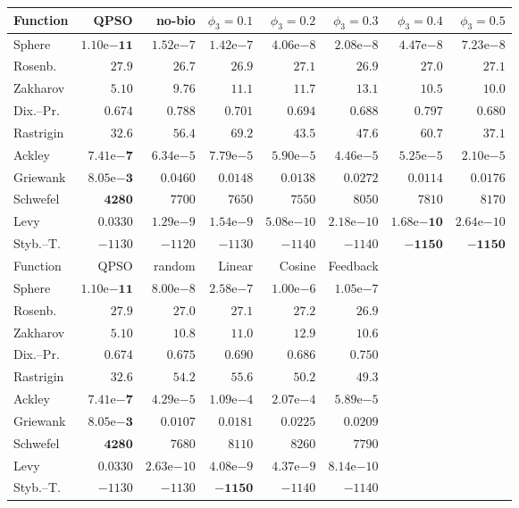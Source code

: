 \begin{tabular}{lrrrrrrr}
\toprule
Function & QPSO & no-bio & $\phi_3=0.1$ & $\phi_3=0.2$ & $\phi_3=0.3$ & $\phi_3=0.4$ & $\phi_3=0.5$ \\
\midrule
Sphere & $\mathbf{1.10\mathrm{e}{-11}}$ & $1.52\mathrm{e}{-7}$ & $1.42\mathrm{e}{-7}$ & $4.06\mathrm{e}{-8}$ & $2.08\mathrm{e}{-8}$ & $4.47\mathrm{e}{-8}$ & $7.23\mathrm{e}{-8}$ \\
Rosenb. & $27.9$ & $\mathbf{26.7}$ & $26.9$ & $27.1$ & $26.9$ & $27.0$ & $27.1$ \\
Zakharov & $\mathbf{5.10}$ & $9.76$ & $11.1$ & $11.7$ & $13.1$ & $10.5$ & $10.0$ \\
Dix.--Pr. & $\mathbf{0.674}$ & $0.788$ & $0.701$ & $0.694$ & $0.688$ & $0.797$ & $0.680$ \\
Rastrigin & $\mathbf{32.6}$ & $56.4$ & $69.2$ & $43.5$ & $47.6$ & $60.7$ & $37.1$ \\
Ackley & $\mathbf{7.41\mathrm{e}{-7}}$ & $6.34\mathrm{e}{-5}$ & $7.79\mathrm{e}{-5}$ & $5.90\mathrm{e}{-5}$ & $4.46\mathrm{e}{-5}$ & $5.25\mathrm{e}{-5}$ & $2.10\mathrm{e}{-5}$ \\
Griewank & $\mathbf{8.05\mathrm{e}{-3}}$ & $0.0460$ & $0.0148$ & $0.0138$ & $0.0272$ & $0.0114$ & $0.0176$ \\
Schwefel & $\mathbf{4280}$ & $7700$ & $7650$ & $7550$ & $8050$ & $7810$ & $8170$ \\
Levy & $0.0330$ & $1.29\mathrm{e}{-9}$ & $1.54\mathrm{e}{-9}$ & $5.08\mathrm{e}{-10}$ & $2.18\mathrm{e}{-10}$ & $\mathbf{1.68\mathrm{e}{-10}}$ & $2.64\mathrm{e}{-10}$ \\
Styb.--T. & $-1130$ & $-1120$ & $-1130$ & $-1140$ & $-1140$ & $-\mathbf{1150}$ & $-\mathbf{1150}$ \\
\midrule
Function & QPSO & random & Linear & Cosine & Feedback &  &  \\
\midrule
Sphere & $\mathbf{1.10\mathrm{e}{-11}}$ & $8.00\mathrm{e}{-8}$ & $2.58\mathrm{e}{-7}$ & $1.00\mathrm{e}{-6}$ & $1.05\mathrm{e}{-7}$ &  &  \\
Rosenb. & $27.9$ & $27.0$ & $27.1$ & $27.2$ & $26.9$ &  &  \\
Zakharov & $\mathbf{5.10}$ & $10.8$ & $11.0$ & $12.9$ & $10.6$ &  &  \\
Dix.--Pr. & $\mathbf{0.674}$ & $0.675$ & $0.690$ & $0.686$ & $0.750$ &  &  \\
Rastrigin & $\mathbf{32.6}$ & $54.2$ & $55.6$ & $50.2$ & $49.3$ &  &  \\
Ackley & $\mathbf{7.41\mathrm{e}{-7}}$ & $4.29\mathrm{e}{-5}$ & $1.09\mathrm{e}{-4}$ & $2.07\mathrm{e}{-4}$ & $5.89\mathrm{e}{-5}$ &  &  \\
Griewank & $\mathbf{8.05\mathrm{e}{-3}}$ & $0.0107$ & $0.0181$ & $0.0225$ & $0.0209$ &  &  \\
Schwefel & $\mathbf{4280}$ & $7680$ & $8110$ & $8260$ & $7790$ &  &  \\
Levy & $0.0330$ & $2.63\mathrm{e}{-10}$ & $4.08\mathrm{e}{-9}$ & $4.37\mathrm{e}{-9}$ & $8.14\mathrm{e}{-10}$ &  &  \\
Styb.--T. & $-1130$ & $-1130$ & $-\mathbf{1150}$ & $-1140$ & $-1140$ &  &  \\
\bottomrule
\end{tabular}
